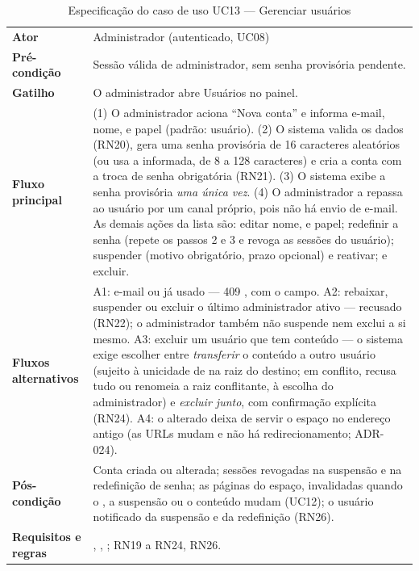 \begin{table}[htb]
\caption{Especificação do caso de uso UC13 --- Gerenciar usuários}\label{tab:uc13}
\small
\begin{tabularx}{\linewidth}{@{}L{3.0cm}Y@{}}
\toprule
\textbf{Ator} & Administrador (autenticado, UC08)\\
\textbf{Pré-condição} & Sessão válida de administrador, sem senha provisória pendente.\\
\textbf{Gatilho} & O administrador abre Usuários no painel.\\
\textbf{Fluxo principal} & (1) O administrador aciona ``Nova conta'' e informa e-mail, nome,  e papel (padrão: usuário). (2) O sistema valida os dados (RN20), gera uma senha provisória de 16 caracteres aleatórios (ou usa a informada, de 8 a 128 caracteres) e cria a conta com a troca de senha obrigatória (RN21). (3) O sistema exibe a senha provisória \emph{uma única vez}. (4) O administrador a repassa ao usuário por um canal próprio, pois não há envio de e-mail. As demais ações da lista são: editar nome,  e papel; redefinir a senha (repete os passos 2 e 3 e revoga as sessões do usuário); suspender (motivo obrigatório, prazo opcional) e reativar; e excluir.\\
\textbf{Fluxos alternativos} & A1: e-mail ou  já usado --- 409 , com o campo. A2: rebaixar, suspender ou excluir o último administrador ativo --- recusado (RN22); o administrador também não suspende nem exclui a si mesmo. A3: excluir um usuário que tem conteúdo --- o sistema exige escolher entre \emph{transferir} o conteúdo a outro usuário (sujeito à unicidade de  na raiz do destino; em conflito, recusa tudo ou renomeia a raiz conflitante, à escolha do administrador) e \emph{excluir junto}, com confirmação explícita (RN24). A4: o  alterado deixa de servir o espaço no endereço antigo (as URLs mudam e não há redirecionamento; ADR-024).\\
\textbf{Pós-condição} & Conta criada ou alterada; sessões revogadas na suspensão e na redefinição de senha; as páginas do espaço, invalidadas quando o , a suspensão ou o conteúdo mudam (UC12); o usuário notificado da suspensão e da redefinição (RN26).\\
\textbf{Requisitos e regras} & , , ; RN19 a RN24, RN26.\\
\bottomrule
\end{tabularx}
\end{table}

